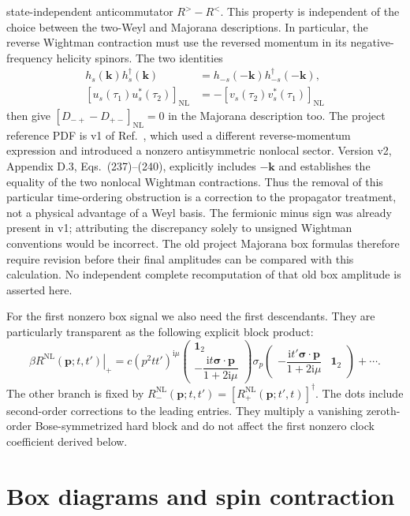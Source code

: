 \documentclass[a4paper,12pt]{article}
\newcommand{\ii}{\mathrm i}
\newcommand{\NL}{\mathrm{NL}}
\newcommand{\bs}{\bm\sigma}
\newcommand{\one}{\mathbf1_2}
\begin{document}
state-independent anticommutator $R^>-R^<$. This property is independent of the choice between the two-Weyl and
Majorana descriptions. In particular, the reverse Wightman contraction must use
the reversed momentum in its negative-frequency helicity spinors. The two
identities
\begin{align}
 h_s(\bm k)h_s^\dagger(\bm k)
 &=h_{-s}(-\bm k)h_{-s}^\dagger(-\bm k),\\
 [u_s(\tau_1)u_s^*(\tau_2)]_{\NL}
 &=-[v_s(\tau_2)v_s^*(\tau_1)]_{\NL}
\end{align}
then give $[D_{-+}-D_{+-}]_{\NL}=0$ in the Majorana description too.
The project reference PDF is v1 of Ref.~\cite{you-v2}, which used a different
reverse-momentum expression and introduced a nonzero antisymmetric nonlocal
sector. Version v2, Appendix D.3, Eqs.~(237)--(240), explicitly includes
$-\bm k$ and establishes the equality of the two nonlocal Wightman contractions.
Thus the removal of this particular time-ordering obstruction is a correction
to the propagator treatment, not a physical advantage of a Weyl basis. The
fermionic minus sign was already present in v1; attributing the discrepancy
solely to unsigned Wightman conventions would be incorrect. The old project
Majorana box formulas therefore require revision before their final amplitudes
can be compared with this calculation. No independent complete recomputation
of that old box amplitude is asserted here.

For the first nonzero box signal we also need the first descendants. They are
particularly transparent as the following explicit block product:
\begin{equation}
 \left.\beta R^{\NL}(\bm p;t,t')\right|_+
 =c(p^2tt')^{\ii\mu}
 \begin{pmatrix}\one\\-\dfrac{\ii t\bs\cdot\bm p}{1+2\ii\mu}\end{pmatrix}
 \sigma_p
 \begin{pmatrix}-\dfrac{\ii t'\bs\cdot\bm p}{1+2\ii\mu}&\one\end{pmatrix}
 +\cdots .
 \label{eq:soft-factored}
\end{equation}
The other branch is fixed by
$R^{\NL}_-(\bm p;t,t')=[R^{\NL}_+(\bm p;t',t)]^\dagger$.
The dots include second-order corrections to the leading entries. They multiply
a vanishing zeroth-order Bose-symmetrized hard block and do not affect the first
nonzero clock coefficient derived below.

\section{Box diagrams and spin contraction}
\end{document}
